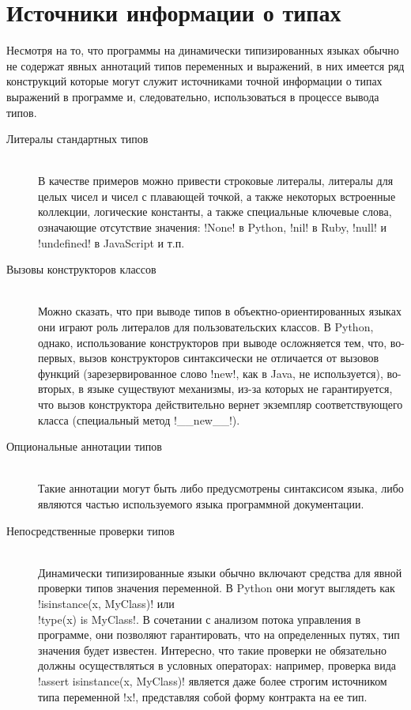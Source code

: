 \section{Источники информации о типах}
\label{sec:type-sources}

Несмотря на то, что программы на динамически типизированных языках обычно не
содержат явных аннотаций типов переменных и выражений, в них
имеется ряд конструкций которые могут служит источниками точной информации о
типах выражений в программе и, следовательно, использоваться в процессе вывода
типов.

\begin{description}
    \item[Литералы стандартных типов] \hfill \\
        В качестве примеров можно привести
        строковые литералы, литералы для целых чисел и чисел с плавающей точкой,
        а также некоторых встроенные коллекции,
        логические константы, а также специальные ключевые слова, означающие
        отсутствие значения: !None! в Python, !nil! в Ruby,
        !null! и !undefined! в JavaScript и т.п.
        
    \item[Вызовы конструкторов классов] \hfill \\
        Можно сказать, что при выводе типов в объектно-ориентированных языках
        они играют роль литералов для пользовательских классов. В Python, однако,
        использование конструкторов при выводе осложняется тем, что, во-первых, вызов
        конструкторов синтаксически не отличается от вызовов функций
        (зарезервированное слово !new!, как в Java, не используется), во-вторых,
        в языке существуют механизмы, из-за которых не гарантируется, что вызов
        конструктора действительно вернет экземпляр соответствующего класса
        (специальный метод !__new__!).

    \item[Опциональные аннотации типов] \hfill \\
        Такие аннотации могут быть либо предусмотрены синтаксисом языка, либо
        являются частью используемого языка программной документации.

    \item[Непосредственные проверки типов] \hfill \\
        Динамически типизированные языки обычно включают средства для явной
        проверки типов значения переменной. В Python они могут
        выглядеть как !isinstance(x, MyClass)! или \\
        !type(x) is MyClass!. В
        сочетании с анализом потока управления в программе, они позволяют
        гарантировать, что на определенных путях, тип значения будет известен. 
        Интересно, что такие проверки не обязательно должны осуществляться в условных
        операторах: например, проверка вида !assert isinstance(x, MyClass)!
        является даже более строгим источником типа переменной !x!, представляя
        собой форму контракта на ее тип.


\end{description}
